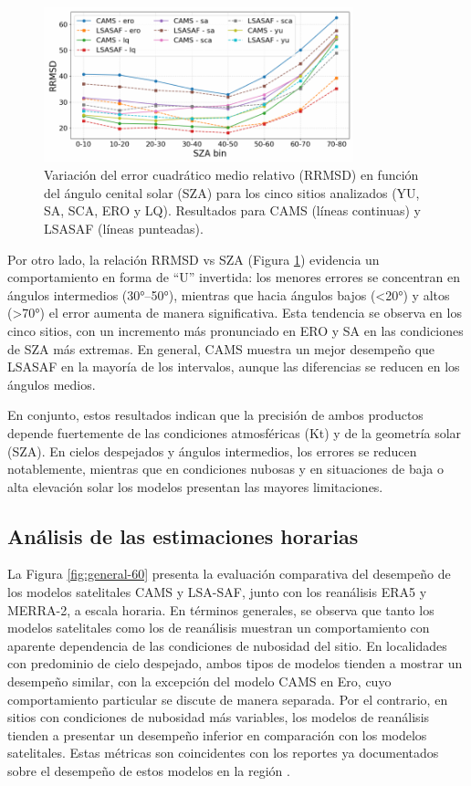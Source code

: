 \begin{figure}
    \centering
    \includegraphics[width=0.8\textwidth]{figuras/RMSE-sza-15.pdf}
    \caption{Variación del error cuadrático medio relativo (RRMSD) en función del ángulo cenital solar (SZA) para los cinco sitios analizados (YU, SA, SCA, ERO y LQ). Resultados para CAMS (líneas continuas) y LSASAF (líneas punteadas).}
    \label{fig:RMSE-SZA-15}
\end{figure}



Por otro lado, la relación RRMSD vs SZA (Figura \ref{fig:RMSE-SZA-15}) evidencia un comportamiento en forma de “U” invertida: los menores errores se concentran en ángulos intermedios (30°–50°), mientras que hacia ángulos bajos (<20°) y altos (>70°) el error aumenta de manera significativa. Esta tendencia se observa en los cinco sitios, con un incremento más pronunciado en ERO y SA en las condiciones de SZA más extremas. En general, CAMS muestra un mejor desempeño que LSASAF en la mayoría de los intervalos, aunque las diferencias se reducen en los ángulos medios.

En conjunto, estos resultados indican que la precisión de ambos productos depende fuertemente de las condiciones atmosféricas (Kt) y de la geometría solar (SZA). En cielos despejados y ángulos intermedios, los errores se reducen notablemente, mientras que en condiciones nubosas y en situaciones de baja o alta elevación solar los modelos presentan las mayores limitaciones.


\subsection{Análisis de las estimaciones horarias}

La Figura \ref{fig:general-60} presenta la evaluación comparativa del desempeño de los modelos satelitales CAMS y LSA-SAF, junto con los reanálisis ERA5 y MERRA-2, a escala horaria. En términos generales, se observa que tanto los modelos satelitales como los de reanálisis muestran un comportamiento con aparente dependencia de las condiciones de nubosidad del sitio. En localidades con predominio de cielo despejado, ambos tipos de modelos tienden a mostrar un desempeño similar, con la excepción del modelo CAMS en Ero, cuyo comportamiento particular se discute de manera separada. Por el contrario, en sitios con condiciones de nubosidad más variables, los modelos de reanálisis tienden a presentar un desempeño inferior en comparación con los modelos satelitales. Estas métricas son coincidentes con los reportes ya documentados sobre el desempeño de estos modelos en la región \citep{Ledesma2025}.\\

